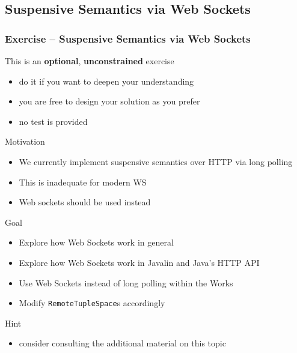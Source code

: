 \documentclass[presentation]{beamer}\mode<presentation>{\usetheme{AMSCesenaPurpleAndGold}}
\begin{document}
\startExercise

\subsection{Suspensive Semantics via Web Sockets}

\begin{frame}[allowframebreaks]
\frametitle{Exercise \currentExercise{} -- Suspensive Semantics via Web Sockets}
	\begin{alertblock}{This is an \textbf{optional}, \textbf{unconstrained} exercise}
		\begin{itemize}
			\item do it if you want to deepen your understanding
			\item you are free to design your solution as you prefer
			\item no test is provided
		\end{itemize}
	\end{alertblock}

	\begin{block}{Motivation}
		\begin{itemize}
			\item We currently implement suspensive semantics over HTTP via \alert{long polling}
			\item This is inadequate for modern WS
			\item Web sockets should be used instead
		\end{itemize}
	\end{block}

	\begin{block}{Goal}
		\begin{itemize}
			\item Explore how Web Sockets work in general
			\item Explore how Web Sockets work in Javalin and Java's HTTP API
			\item Use Web Sockets instead of long polling within the \linda{} Works
			\item Modify \texttt{RemoteTupleSpace}s accordingly
		\end{itemize}
	\end{block}

	\begin{exampleblock}{Hint}
		\begin{itemize}
			\item consider consulting the additional material on this topic
		\end{itemize}
	\end{exampleblock}
\end{frame}
\end{document}
